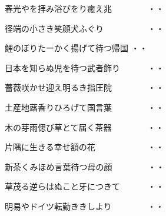 \vspace{0.6cm}
\begin{shiika}春光やを拝み浴びをり癒え兆　　　　
\hfill{・・}\end{shiika}
\vspace{0.6cm}
\begin{shiika}径端の小さき笑顔犬ふぐり　　　　　
\hfill{・・}\end{shiika}
\vspace{0.6cm}
\begin{shiika}鯉のぼりたーかく揚げて待つ帰国
\hfill{・・}\end{shiika}
\vspace{0.6cm}
\begin{shiika}日本を知らぬ児を待つ武者飾り　　　
\hfill{・・}\end{shiika}
\vspace{0.6cm}
\begin{shiika}薔薇咲かせ迎え明るき指圧院　　　　
\hfill{・・}\end{shiika}
\vspace{0.6cm}
\begin{shiika}土産地蕗香りひろげて国言葉　　　　
\hfill{・・}\end{shiika}
\vspace{0.6cm}
\begin{shiika}木の芽雨偲び草とて届く茶器　　　　
\hfill{・・}\end{shiika}
\vspace{0.6cm}
\begin{shiika}片隅に生きる幸せ額の花　　　　　　
\hfill{・・}\end{shiika}
\vspace{0.6cm}
\begin{shiika}新茶くみほめ言葉待つ母の顔　　　　
\hfill{・・}\end{shiika}
\vspace{0.6cm}
\begin{shiika}草茂る逆らはぬこと牙につきて　　　
\hfill{・・}\end{shiika}
\vspace{0.6cm}
\begin{shiika}明易やドイツ転勤ききしより　　　　
\hfill{・・}\end{shiika}
